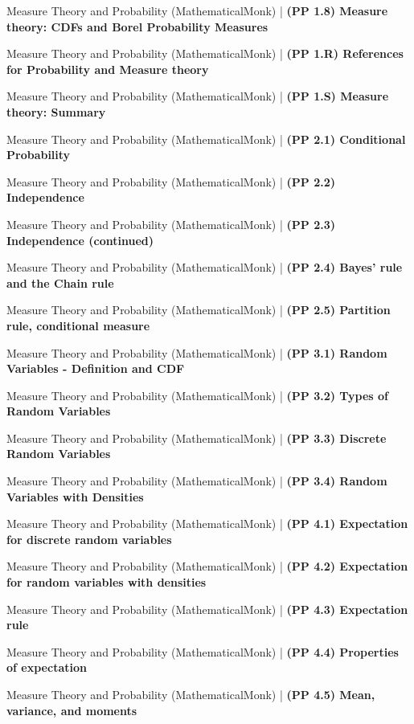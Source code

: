 \documentclass[a4, landscape, 12pt]{article}
\newcommand{\checkbox}{$\square$}%
\begin{document}
\begin{itemize}
{{}
\item [\checkbox] Measure Theory and Probability (MathematicalMonk)  | \textbf{(PP 1.8) Measure theory: CDFs and Borel Probability Measures
}
\item [\checkbox] Measure Theory and Probability (MathematicalMonk)  | \textbf{(PP 1.R) References for Probability and Measure theory
}
\item [\checkbox] Measure Theory and Probability (MathematicalMonk)  | \textbf{(PP 1.S) Measure theory: Summary
}
\item [\checkbox] Measure Theory and Probability (MathematicalMonk)  | \textbf{(PP 2.1) Conditional Probability
}
\item [\checkbox] Measure Theory and Probability (MathematicalMonk)  | \textbf{(PP 2.2) Independence
}
\item [\checkbox] Measure Theory and Probability (MathematicalMonk)  | \textbf{(PP 2.3) Independence (continued)
}
\item [\checkbox] Measure Theory and Probability (MathematicalMonk)  | \textbf{(PP 2.4) Bayes' rule and the Chain rule
}
\item [\checkbox] Measure Theory and Probability (MathematicalMonk)  | \textbf{(PP 2.5) Partition rule, conditional measure
}
\item [\checkbox] Measure Theory and Probability (MathematicalMonk)  | \textbf{(PP 3.1) Random Variables - Definition and CDF
}
\item [\checkbox] Measure Theory and Probability (MathematicalMonk)  | \textbf{(PP 3.2) Types of Random Variables
}
\item [\checkbox] Measure Theory and Probability (MathematicalMonk)  | \textbf{(PP 3.3) Discrete Random Variables
}
\item [\checkbox] Measure Theory and Probability (MathematicalMonk)  | \textbf{(PP 3.4) Random Variables with Densities
}
\item [\checkbox] Measure Theory and Probability (MathematicalMonk)  | \textbf{(PP 4.1) Expectation for discrete random variables
}
\item [\checkbox] Measure Theory and Probability (MathematicalMonk)  | \textbf{(PP 4.2) Expectation for random variables with densities
}
\item [\checkbox] Measure Theory and Probability (MathematicalMonk)  | \textbf{(PP 4.3) Expectation rule
}
\item [\checkbox] Measure Theory and Probability (MathematicalMonk)  | \textbf{(PP 4.4) Properties of expectation
}
\item [\checkbox] Measure Theory and Probability (MathematicalMonk)  | \textbf{(PP 4.5) Mean, variance, and moments
}}
\end{itemize}
\end{document}
